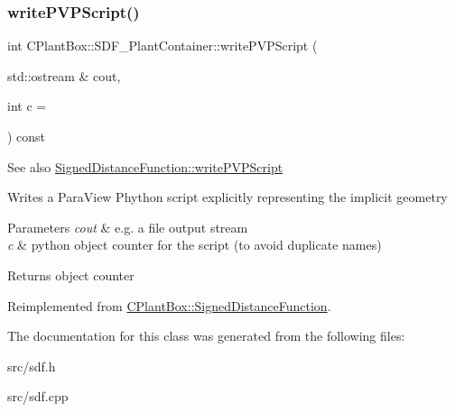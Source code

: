 \subsubsection{\texorpdfstring{write\+P\+V\+P\+Script()}{writePVPScript()}}
{\footnotesize\ttfamily int C\+Plant\+Box\+::\+S\+D\+F\+\_\+\+Plant\+Container\+::write\+P\+V\+P\+Script (\begin{DoxyParamCaption}\item[{std\+::ostream \&}]{cout,  }\item[{int}]{c = {} }\end{DoxyParamCaption}) const\hspace{0.3cm}{\ttfamily [virtual]}}

\begin{DoxySeeAlso}{See also}
\hyperlink{classCPlantBox_1_1SignedDistanceFunction_a0098fb469c9be5557d5593cec9e76d2a}{Signed\+Distance\+Function\+::write\+P\+V\+P\+Script}
\end{DoxySeeAlso}
Writes a Para\+View Phython script explicitly representing the implicit geometry


\begin{DoxyParams}{Parameters}
{\em cout} & e.\+g. a file output stream \\
\hline
{\em c} & python object counter for the script (to avoid duplicate names) \\
\hline
\end{DoxyParams}
\begin{DoxyReturn}{Returns}
object counter 
\end{DoxyReturn}


Reimplemented from \hyperlink{classCPlantBox_1_1SignedDistanceFunction_a0098fb469c9be5557d5593cec9e76d2a}{C\+Plant\+Box\+::\+Signed\+Distance\+Function}.



The documentation for this class was generated from the following files\+:\begin{DoxyCompactItemize}
\item 
src/sdf.\+h\item 
src/sdf.\+cpp\end{DoxyCompactItemize}
